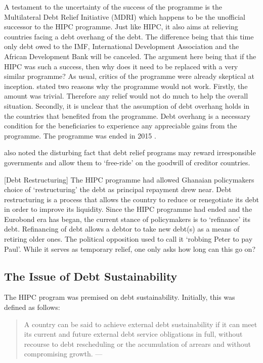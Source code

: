 \documentclass[14pt, a4paper]{article}
\begin{document}
	A testament to the uncertainty of the success of the programme is the Multilateral Debt Relief Initiative (MDRI) which happens to be the unofficial successor to the HIPC programme. Just like HIPC, it also aims at relieving countries facing a debt overhang of the debt. The difference being that this time only debt owed to the IMF, International Development Association and the African Development Bank will be canceled. The argument here being that if the HIPC was such a success, then why does it need to be replaced with a very similar programme? As usual, critics of the programme were already skeptical at inception.  stated two reasons why the programme would not work. Firstly, the amount was trivial. Therefore any relief would not do much to help the overall situation. Secondly, it is unclear that the assumption of debt overhang holds in the countries that benefited from the programme. Debt overhang is a necessary condition for the beneficiaries to experience any appreciable gains from the programme. The programme was ended in 2015 \cite{IMF2016}.
	
	 also noted the disturbing fact that debt relief programs may reward irresponsible governments and allow them to `free-ride' on the goodwill of creditor countries.
	
	[Debt Restructuring]
	The HIPC programme had allowed Ghanaian policymakers choice of `restructuring' the debt as principal repayment drew near. Debt restructuring is a process that allows the country to reduce or renegotiate its debt in order to improve its liquidity.  Since the HIPC programme had ended and the Eurobond era has began, the current stance of policymakers is to `refinance' its debt. Refinancing of debt allows a debtor to take new debt(s) as a means of retiring older ones. The political opposition used to call it `robbing Peter to pay Paul'. While it serves as temporary relief, one only asks how long can this go on? 
	
	\subsection{The Issue of Debt Sustainability}
	The HIPC program was premised on debt sustainability. Initially, this was defined as follows:
	
	\begin{quotation}
		A country can be said to achieve external debt sustainability if it can meet its current and future external debt service obligations in full, without recourse to debt rescheduling or the accumulation of arrears and without compromising growth.
		\hspace{1em plus 1fill}---\cite{THECHALLENGE}
	\end{quotation}
	
\end{document}
